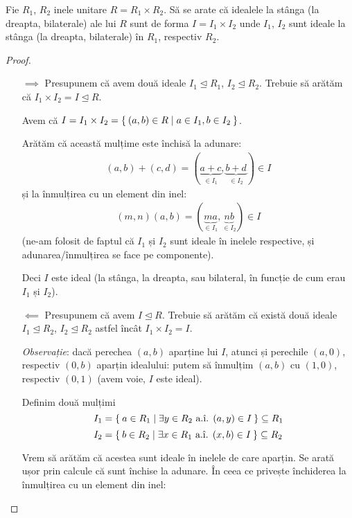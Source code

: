 \begin{exercise}[2.7]
Fie \(R_1\), \(R_2\) inele unitare \(R = R_1 \times R_2\).
Să se arate că idealele la stânga (la dreapta, bilaterale) ale lui \(R\) sunt de forma \(I = I_1 \times I_2\)
unde \(I_1\), \(I_2\) sunt ideale la stânga (la dreapta, bilaterale) în \(R_1\), respectiv \(R_2\).
\end{exercise}
\begin{proof}
\begin{itemize}
    \item[\(\implies\)] Presupunem că avem două ideale \(I_1 \trianglelefteq R_1\), \(I_2 \trianglelefteq R_2\). Trebuie să arătăm că \(I_1 \times I_2 = I \trianglelefteq R\).
    
    Avem că \(I = I_1 \times I_2 = \Set{ (a, b) \in R | a \in I_1, b \in I_2 }\).
    
    Arătăm că această mulțime este închisă la adunare:
    \begin{align*}
        (a, b) + (c, d) = (\underbrace{a + c}_{\in I_1}, \underbrace{b + d}_{\in I_2}) \in I
    \end{align*}
    și la înmulțirea cu un element din inel:
    \begin{align*}
        (m, n) (a, b) = (\underbrace{ma}_{\in I_1}, \underbrace{nb}_{\in I_2}) \in I
    \end{align*}
    (ne-am folosit de faptul că \(I_1\) și \(I_2\) sunt ideale în inelele respective, și adunarea\slash înmulțirea se face pe componente).
    
    Deci \(I\) este ideal (la stânga, la dreapta, sau bilateral, în funcție de cum erau \(I_1\) și \(I_2\)).

    \item[\(\impliedby\)] Presupunem că avem \(I \trianglelefteq R\). Trebuie să arătăm că există două ideale \(I_1 \trianglelefteq R_2\), \(I_2 \trianglelefteq R_2\) astfel încât \(I_1 \times I_2 = I\).
    
    \emph{Observație}: dacă perechea \((a, b)\) aparține lui \(I\), atunci și perechile \((a, 0)\), respectiv \((0, b)\) aparțin idealului: putem să înmulțim \((a, b)\) cu \((1, 0)\), respectiv \((0, 1)\) (avem voie, \(I\) este ideal).
    
    Definim două mulțimi
    \[
    I_1 = \Set{ a \in R_1 | \exists y \in R_2 \text{ a.î. } (a, y) \in I } \subseteq R_1
    \]
    \[
    I_2 = \Set{ b \in R_2 | \exists x \in R_1 \text{ a.î. } (x, b) \in I } \subseteq R_2
    \]
    
    
    Vrem să arătăm că acestea sunt ideale în inelele de care aparțin. Se arată ușor prin calcule că sunt închise la adunare. În ceea ce privește închiderea la înmulțirea cu un element din inel:
    

\end{itemize}
\end{proof}
